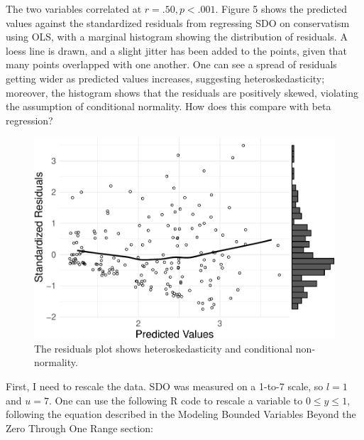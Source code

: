 \documentclass[english,,man]{apa6}
\newenvironment{Shaded}{\begin{snugshade}}{\end{snugshade}}
\newcommand{\DecValTok}[1]{\textcolor[rgb]{0.00,0.00,0.81}{#1}}
\newcommand{\NormalTok}[1]{#1}
\newcommand{\OperatorTok}[1]{\textcolor[rgb]{0.81,0.36,0.00}{\textbf{#1}}}
\newcommand{\StringTok}[1]{\textcolor[rgb]{0.31,0.60,0.02}{#1}}
\begin{document}
The two variables correlated at \(r = .50, p < .001\). Figure 5 shows the predicted values against the standardized residuals from regressing SDO on conservatism using OLS, with a marginal histogram showing the distribution of residuals. A loess line is drawn, and a slight jitter has been added to the points, given that many points overlapped with one another. One can see a spread of residuals getting wider as predicted values increases, suggesting heteroskedasticity; moreover, the histogram shows that the residuals are positively skewed, violating the assumption of conditional normality. How does this compare with beta regression?

\begin{figure}
\centering
\includegraphics{beta_hurdle_files/figure-latex/unnamed-chunk-12-1.pdf}
\caption{\label{fig:unnamed-chunk-12}The residuals plot shows heteroskedasticity and conditional non-normality.}
\end{figure}

First, I need to rescale the data. SDO was measured on a 1-to-7 scale, so \(l = 1\) and \(u = 7\). One can use the following R code to rescale a variable to \(0 \leq y \leq 1\), following the equation described in the Modeling Bounded Variables Beyond the Zero Through One Range section:

\begin{Shaded}
\end{Shaded}
\end{document}
